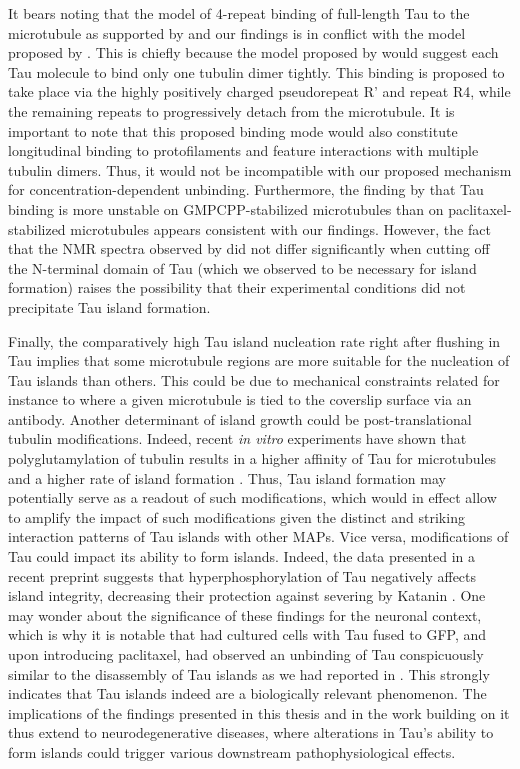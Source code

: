 It bears noting that the model of 4-repeat binding of full-length Tau to the microtubule as supported by \cite{Kellogg2018} and our findings is in conflict with the model proposed by \cite{Mammeri}. This is chiefly because the model proposed by \cite{Mammeri} would suggest each Tau molecule to bind only one tubulin dimer tightly. This binding is proposed to take place via the highly positively charged pseudorepeat R' and repeat R4, while the remaining repeats to progressively detach from the microtubule. It is important to note that this proposed binding mode would also constitute longitudinal binding to protofilaments and feature interactions with multiple tubulin dimers. Thus, it would not be incompatible with our proposed mechanism for concentration-dependent unbinding. Furthermore, the finding by \cite{Mammeri} that Tau binding is more unstable on GMPCPP-stabilized microtubules than on paclitaxel-stabilized microtubules appears consistent with our findings. However, the fact that the NMR spectra observed by \cite{Mammeri} did not differ significantly when cutting off the N-terminal domain of Tau (which we observed to be necessary for island formation) raises the possibility that their experimental conditions did not precipitate Tau island formation.\par

Finally, the comparatively high Tau island nucleation rate right after flushing in Tau  implies that some microtubule regions are more suitable for the nucleation of Tau islands than others. This could be due to mechanical constraints related for instance to where a given microtubule is tied to the coverslip surface via an antibody. Another determinant of island growth could be post-translational tubulin modifications. Indeed, recent \textit{in vitro} experiments have shown that polyglutamylation of tubulin results in a higher affinity of Tau for microtubules and a higher rate of island formation . Thus, Tau island formation may potentially serve as a readout of such modifications, which would in effect allow to amplify the impact of such modifications given the distinct and striking interaction patterns of Tau islands with other MAPs. Vice versa, modifications of Tau could impact its ability to form islands. Indeed, the data presented in a recent preprint suggests that hyperphosphorylation of Tau negatively affects island integrity, decreasing their protection against severing by Katanin . One may wonder about the significance of these findings for the neuronal context, which is why it is notable that \cite{siahaan2022microtubule} had cultured cells with Tau fused to GFP, and upon introducing paclitaxel, had observed an unbinding of Tau conspicuously similar to the disassembly of Tau islands as we had reported in . This strongly indicates that Tau islands indeed are a biologically relevant phenomenon. The implications of the findings presented in this thesis and in the work building on it thus extend to neurodegenerative diseases, where alterations in Tau's ability to form islands could trigger various downstream pathophysiological effects.